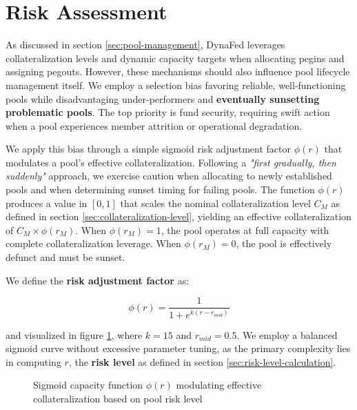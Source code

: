 \section{Risk Assessment}
\label{sec:risk-assessment}

As discussed in section \ref{sec:pool-management}, DynaFed leverages collateralization levels and dynamic capacity targets when allocating pegins and assigning pegouts. However, these mechanisms should also influence pool lifecycle management itself. We employ a selection bias favoring reliable, well-functioning pools while disadvantaging under-performers and \textbf{eventually sunsetting problematic pools}. The top priority is fund security, requiring swift action when a pool experiences member attrition or operational degradation.

We apply this bias through a simple sigmoid risk adjustment factor $\phi(r)$ that modulates a pool's effective collateralization. Following a \textit{"first gradually, then suddenly"} approach, we exercise caution when allocating to newly established pools and when determining sunset timing for failing pools. The function $\phi(r)$ produces a value in $[0, 1]$ that scales the nominal collateralization level $C_M$ as defined in section \ref{sec:collateralization-level}, yielding an effective collateralization of $C_M \times \phi(r_M)$. When $\phi(r_M) = 1$, the pool operates at full capacity with complete collateralization leverage. When $\phi(r_M) = 0$, the pool is effectively defunct and must be sunset.

We define the \textbf{risk adjustment factor} as:

\begin{equation}
    \label{eq:risk-sigmoid}
    \phi(r) = \frac{1}{1 + e^{k(r - r_{mid})}}
\end{equation}

and visualized in figure \ref{fig:sigmoid-capacity}, where $k=15$ and $r_{mid}=0.5$. We employ a balanced sigmoid curve without excessive parameter tuning, as the primary complexity lies in computing $r$, the \textbf{risk level} as defined in section \ref{sec:risk-level-calculation}.

\begin{figure}[h]
    \centering
    \caption{\small Sigmoid capacity function $\phi(r)$ modulating effective collateralization based on pool risk level}
    \label{fig:sigmoid-capacity}
\end{figure}

